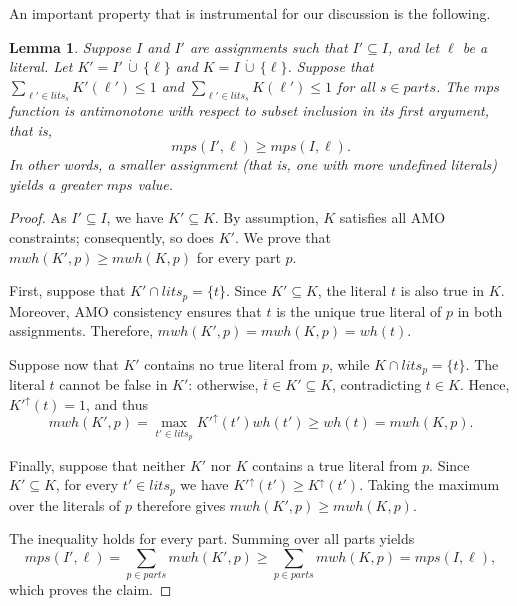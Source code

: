 \documentclass[preprint,authoryear]{elsarticle}
\newcommand{\lits}{\mathit{lits}}
\newcommand{\mwh}{\mathit{mwh}}
\newcommand{\wh}{\mathit{wh}}
\newcommand{\mps}{\mathit{mps}}
\newcommand{\parts}{\mathit{parts}}
\newtheorem{lemma}{Lemma}
\newcommand{\cupdot}{\,\dot{\cup}\,}
\theoremstyle{definition}
\begin{document}
An important property that is instrumental for our discussion is the following.
{\color{blue}
\begin{lemma}
\label{lemma:maximal_subset:antimonote}
    Suppose $I$ and $I'$ are assignments such that $I' \subseteq I$, and let $\ell$ be a literal. Let $K' = I' \cupdot \{\ell\}$ and $K = I \cupdot \{\ell\}$. Suppose that $\sum_{\ell' \in \lits_s} K'(\ell') \le 1$ and $\sum_{\ell' \in \lits_s} K(\ell') \le 1$ for all $s \in \parts$. The $\mps$ function is antimonotone with respect to subset inclusion in its first argument, that is,
    $$
    \mps(I',\ell) \ge \mps(I,\ell).
    $$
    In other words, a smaller assignment (that is, one with more undefined literals) yields a greater $\mps$ value.
\end{lemma}
\begin{proof}
As $I' \subseteq I$, we have $K' \subseteq K$. By assumption, $K$ satisfies all AMO constraints; consequently, so does $K'$.
We prove that $\mwh(K',p) \geq \mwh(K,p)$ for every part $p$.

First, suppose that $K' \cap \lits_p = \{t\}$. Since $K' \subseteq K$, the literal $t$ is also true in $K$. Moreover, AMO consistency ensures that $t$ is the unique true literal of $p$ in both assignments. Therefore, $\mwh(K',p)=\mwh(K,p)=\wh(t)$.

Suppose now that $K'$ contains no true literal from $p$, while $K \cap \lits_p=\{t\}$. The literal $t$ cannot be false in $K'$: otherwise, $\overline{t}\in K'\subseteq K$, contradicting $t\in K$. 
Hence, $K'^\uparrow(t)=1$, and thus
$$
\mwh(K',p) = \max_{t'\in\lits_p} K'^\uparrow(t')\wh(t') \geq \wh(t) = \mwh(K,p).
$$

Finally, suppose that neither $K'$ nor $K$ contains a true literal from $p$. Since $K'\subseteq K$, for every $t'\in\lits_p$ we have $K'^\uparrow(t')\geq K^\uparrow(t')$.
Taking the maximum over the literals of $p$ therefore gives $\mwh(K',p)\geq\mwh(K,p)$.

The inequality holds for every part. Summing over all parts yields 
$$\mps(I',\ell) = \sum_{p\in\parts}\mwh(K',p) \geq \sum_{p\in\parts}\mwh(K,p) = \mps(I,\ell),$$ 
which proves the claim.
\end{proof}
}
\end{document}
